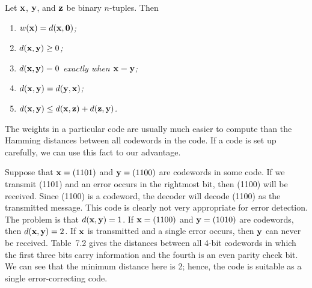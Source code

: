  
\begin{proposition}
Let ${\bold x}$, ${\bold y}$, and ${\bold z}$ be binary $n$-tuples.
Then 
\begin{enumerate}
 
\rm \item \it
$w({\bold x}) = d( {\bold x}, {\bold 0})$; 
 
\rm \item \it
$d( {\bold x}, {\bold y}) \geq 0$; 
 
\rm \item \it
$d( {\bold x}, {\bold y}) = 0$ exactly when ${\bold x} = {\bold y}$; 
 
\rm \item \it
$d( {\bold x}, {\bold y})= d( {\bold y}, {\bold x})$; 
 
\rm \item \it
$d( {\bold x}, {\bold y}) \leq d( {\bold x}, {\bold z}) + d( {\bold
z}, {\bold y})$. 
 
\end{enumerate}
\end{proposition}
 
 
The weights in a particular code are usually much easier to compute
than the Hamming distances between all codewords in the code. If a
code is set up carefully, we can use this fact to our advantage.
 
 
Suppose that ${\bold x} = (1101)$ and ${\bold y} = (1100)$ are
codewords in some code. If we transmit (1101) and an error occurs in
the rightmost bit, then (1100) will be received. Since (1100) is a
codeword, the decoder will decode (1100) as the transmitted message.
This code is clearly not very appropriate for error detection. The
problem is that $d({\bold x}, {\bold y}) = 1$. If ${\bold x} = (1100)$
and ${\bold y} = (1010)$ are codewords, then $d({\bold x}, {\bold y})
= 2$. If ${\bold x}$ is transmitted and a single error occurs, then
${\bold y}$ can never be received. Table~7.2 gives the distances
between all 4-bit codewords in which the first three bits carry
information and the fourth is an even parity check bit. We can see
that the minimum distance here is 2; hence, the code is suitable as
a single error-correcting code. 
 
